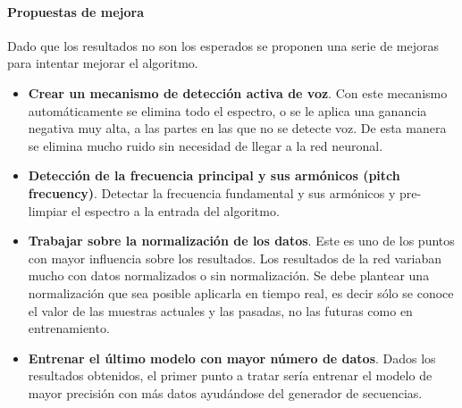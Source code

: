 \paragraph{Propuestas de mejora}
Dado que los resultados no son los esperados se proponen una serie de mejoras para intentar mejorar el algoritmo.
\begin{itemize}
	\item \textbf{Crear un mecanismo de detección activa de voz}. Con este mecanismo automáticamente se elimina todo el espectro, o se le aplica una ganancia negativa muy alta, a las partes en las que no se detecte voz. De esta manera se elimina mucho ruido sin necesidad de llegar a la red neuronal.
	\item \textbf{Detección de la frecuencia principal y sus armónicos (pitch frecuency)}. Detectar la frecuencia fundamental y sus armónicos y pre-limpiar el espectro a la entrada del algoritmo.
	\item \textbf{Trabajar sobre la normalización de los datos}. Este es uno de los puntos con mayor influencia sobre los resultados. Los resultados de la red variaban mucho con datos normalizados o sin normalización. Se debe plantear una normalización que sea posible aplicarla en tiempo real, es decir sólo se conoce el valor de las muestras actuales y las pasadas, no las futuras como en entrenamiento.
	\item \textbf{Entrenar el último modelo con mayor número de datos}. Dados los resultados obtenidos, el primer punto a tratar sería entrenar el modelo de mayor precisión con más datos ayudándose del generador de secuencias.
\end{itemize}

